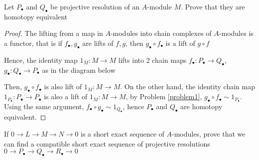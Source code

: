 \begin{problem}[problem 2]
	Let $P_\bullet$ and $Q_\bullet$ be projective resolution of an $A$-module $M$. Prove that they are homotopy equivalent
\end{problem}

\begin{proof}
	The lifting from a map in $A$-modules into chain complexes of $A$-modules is a functor, that is if $f_\bullet, g_\bullet$ are lifts of $f, g$, then $g_\bullet \circ f_\bullet$ is a lift of $g \circ f$
	\begin{center}
	\end{center}
	
	Hence, the identity map $1_M: M \to M$ lifts into 2 chain maps $f_\bullet : P_\bullet \to Q_\bullet$, $g_\bullet : Q_\bullet \to P_\bullet$ as in the diagram below
	\begin{center}
	\end{center}
	
	Then, $g_\bullet \circ f_\bullet$ is also lift of $1_M: M \to M$. On the other hand, the identity chain map $1_{P_\bullet}: P_\bullet \to P_\bullet$ is also a lift of $1_M: M \to M$, by Problem \ref{problem1}, $g_\bullet \circ f_\bullet \sim 1_{P_\bullet}$. Using the same argument, $f_\bullet \circ g_\bullet \sim 1_{Q_\bullet}$, hence $P_\bullet$ and $Q_\bullet$ are homotopy equivalent.
	
\end{proof}

\begin{problem} [problem 3]
	\label{problem3}
	If $0 \to L \to M \to N \to 0$ is a short exact sequence of $A$-modules, prove that we can find a compatible short exact sequence of projective resolutions $0 \to P_\bullet \to Q_\bullet \to R_\bullet \to 0$
\end{problem}

